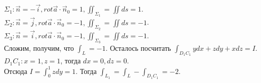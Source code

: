 \documentclass[12pt]{article}
\begin{document}
$\Sigma_1 : \overrightarrow{n} = -\overrightarrow{i}, rot \overrightarrow{a} \cdot \overrightarrow{n}_0 = 1, \iint_{\Sigma_1} = \iint ds = 1$.\\
$\Sigma_2 : \overrightarrow{n} = \overrightarrow{j}, rot \overrightarrow{a} \cdot \overrightarrow{n}_0 = -1, \iint_{\Sigma_2} = \iint ds = -1$.\\
$\Sigma_3 : \overrightarrow{n} = \overrightarrow{i}, rot \overrightarrow{a} \cdot \overrightarrow{n}_0 = -1, \iint_{\Sigma_3} = \iint ds = -1$.\\
Сложим, получим, что $\int_L = -1$. Осталось посчитать $\int_{D_1C_1} ydx + zdy + xdz = I$.\\
$D_1C_1 : x = 1, z = 1$, тогда $dx = 0, dz = 0$.\\
Отсюда $I = \int_0^1 zdy = 1$. Тогда $\int_{L_1} = \int_L - \int_{D_1C_1} = -2$.\\
\end{document}
